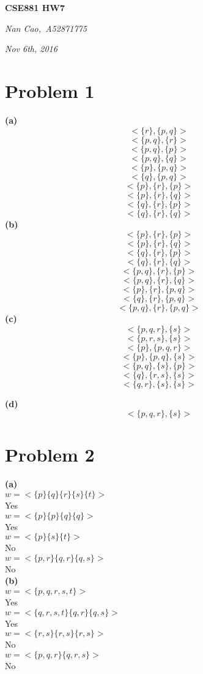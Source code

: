 \documentclass[11pt]{scrartcl}
\begin{document}
\centerline{\LARGE{\textbf{CSE881 HW7}}}
\centerline{\large{\textit{Nan Cao,\  A52871775}}}
\centerline{\large{\textit{Nov 6th, 2016}}}

\section*{Problem 1}
\textbf{(a)}\\

$$<\{r\},\{p,q\}>$$
$$<\{p,q\},\{r\}>$$
$$<\{p,q\},\{p\}>$$
$$<\{p,q\},\{q\}>$$
$$<\{p\},\{p,q\}>$$
$$<\{q\},\{p,q\}>$$
$$<\{p\},\{r\},\{p\}>$$
$$<\{p\},\{r\},\{q\}>$$
$$<\{q\},\{r\},\{p\}>$$
$$<\{q\},\{r\},\{q\}>$$
\textbf{(b)}\\
$$<\{p\},\{r\},\{p\}>$$
$$<\{p\},\{r\},\{q\}>$$
$$<\{q\},\{r\},\{p\}>$$
$$<\{q\},\{r\},\{q\}>$$
$$<\{p,q\},\{r\},\{p\}>$$
$$<\{p,q\},\{r\},\{q\}>$$
$$<\{p\},\{r\},\{p,q\}>$$
$$<\{q\},\{r\},\{p,q\}>$$
$$<\{p,q\},\{r\},\{p,q\}>$$
\newpage
\textbf{(c)}\\
$$<\{p,q,r\},\{s\}>$$%
$$<\{p,r,s\},\{s\}>$$%
$$<\{p\},\{p,q,r\}>$$%
$$<\{p\},\{p,q\},\{s\}>$$%
$$<\{p,q\},\{s\},\{p\}>$$%
$$<\{q\},\{r,s\},\{s\}>$$%
$$<\{q,r\},\{s\},\{s\}>$$%

\textbf{(d)}
$$<\{p,q,r\},\{s\}>$$%
\section*{Problem 2}
\textbf{(a)}\\
$w=<\{p\}\{q\}\{r\}\{s\}\{t\} >$\\
Yes\\
$w=< \{p\}\{p\}\{q\}\{q\} >$\\
Yes\\
$w=< \{p\}\{s\}\{t\} >$\\
No\\
$w=< \{p, r\}\{q, r\}\{q, s\} >$\\
No\\
\textbf{(b)}\\
$w =< \{p, q, r, s, t\} >$\\
Yes\\
$w =< \{q,r, s, t\}\{q,r\}\{q,s\} >$\\
Yes\\
$w =< \{r, s\}\{r, s\}\{r, s\} >$\\
No\\
$w =< \{p, q, r\}\{q, r, s\} >$\\
No\\
\end{document}

